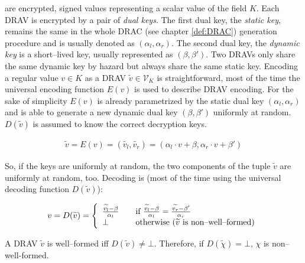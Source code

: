 %
%
\label{sec:drav}

 are encrypted, signed values
representing a scalar value of the field $K$. Each DRAV is encrypted by a pair
of \emph{dual keys}. The first dual key, the \emph{static key}, remains the same
in the whole DRAC (see chapter \ref{def:DRAC}) generation procedure and is
usually denoted as $(\alpha_l, \alpha_r)$. The second dual key, the
\emph{dynamic key} is a short--lived key, usually represented as $(\beta,
\beta')$. Two DRAVs only share the same dynamic key by hazard but always share
the same static key. Encoding a regular value $v \in K$ as a DRAV
$\widetilde{v} \in \mathcal{V}_K$ is straightforward, most of the time the
universal encoding function $E(v)$ is used to describe DRAV encoding. For the
sake of simplicity $E(v)$ is already parametrized by the static dual key
$(\alpha_l, \alpha_r)$ and is able to generate a new dynamic dual key $(\beta,
\beta')$ uniformly at random. $D(\widetilde{v})$ is assumed to know the correct
decryption keys.

\begin{align*}
  \widetilde{v} = E(v) = (\widetilde{v_l}, \widetilde{v_r}) =
    (\alpha_l \cdot v + \beta, \alpha_r \cdot v + \beta')
\end{align*}

\noindent{}So, if the keys are uniformly at random, the two components of the
tuple $\widetilde{v}$ are uniformly at random, too. Decoding is (most of the
time using the universal decoding function $D(\widetilde{v})$):

\begin{align*}
  v = D(\widetilde{v}) =
  \left\{
    \begin{array}{l l}
      \frac{\widetilde{v_l} - \beta}{\alpha_l} & \quad
      \text{if}~\frac{\widetilde{v_l} - \beta}{\alpha_l} =
      \frac{\widetilde{v_r} - \beta'}{\alpha_r}\\
      \bot & \quad \text{otherwise ($\widetilde{v}$ is non--well--formed)}\\
    \end{array}\right.
\end{align*}



A DRAV $\widetilde{v}$ is well--formed iff $D(\widetilde{v}) \neq \bot$.
Therefore, if $D(\widetilde{\chi}) = \bot$, $\chi$ is non--well-formed.


